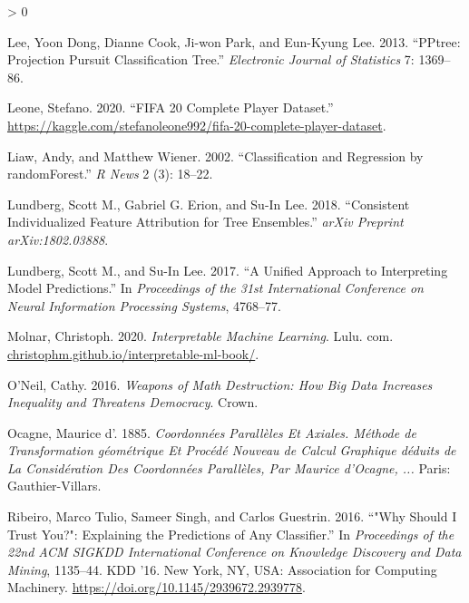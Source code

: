 \documentclass[
]{article}
\newlength{\cslhangindent}
\newenvironment{CSLReferences}[2] %
 {%
  \setlength{\parindent}{0pt}
  \ifodd #1 \everypar{\setlength{\hangindent}{\cslhangindent}}\ignorespaces\fi
  \ifnum #2 > 0
  \setlength{\parskip}{#2\baselineskip}
  \fi
 }%
 {}
\begin{document}
\begin{CSLReferences}{1}{0}
\leavevmode\hypertarget{ref-lee_pptree_2013}{}%
Lee, Yoon Dong, Dianne Cook, Ji-won Park, and Eun-Kyung Lee. 2013. {``{PPtree}: {Projection} Pursuit Classification Tree.''} \emph{Electronic Journal of Statistics} 7: 1369--86.

\leavevmode\hypertarget{ref-leone_fifa_2020}{}%
Leone, Stefano. 2020. {``{FIFA} 20 Complete Player Dataset.''} \url{https://kaggle.com/stefanoleone992/fifa-20-complete-player-dataset}.

\leavevmode\hypertarget{ref-liaw_classification_2002}{}%
Liaw, Andy, and Matthew Wiener. 2002. {``Classification and Regression by {randomForest}.''} \emph{R News} 2 (3): 18--22.

\leavevmode\hypertarget{ref-lundberg_consistent_2018}{}%
Lundberg, Scott M., Gabriel G. Erion, and Su-In Lee. 2018. {``Consistent Individualized Feature Attribution for Tree Ensembles.''} \emph{arXiv Preprint arXiv:1802.03888}.

\leavevmode\hypertarget{ref-lundberg_unified_2017}{}%
Lundberg, Scott M., and Su-In Lee. 2017. {``A Unified Approach to Interpreting Model Predictions.''} In \emph{Proceedings of the 31st International Conference on Neural Information Processing Systems}, 4768--77.

\leavevmode\hypertarget{ref-molnar_interpretable_2020}{}%
Molnar, Christoph. 2020. \emph{Interpretable Machine Learning}. Lulu. com. \href{https://christophm.github.io/interpretable-ml-book/}{christophm.github.io/interpretable-ml-book/}.

\leavevmode\hypertarget{ref-oneil_weapons_2016}{}%
O'Neil, Cathy. 2016. \emph{Weapons of Math Destruction: {How} Big Data Increases Inequality and Threatens Democracy}. Crown.

\leavevmode\hypertarget{ref-ocagne_coordonnees_1885}{}%
Ocagne, Maurice d'. 1885. \emph{Coordonnées Parallèles Et Axiales. {Méthode} de Transformation géométrique Et Procédé Nouveau de Calcul Graphique déduits de La Considération Des Coordonnées Parallèles, Par {Maurice} d'{Ocagne}, ...} Paris: Gauthier-Villars.

\leavevmode\hypertarget{ref-ribeiro_why_2016}{}%
Ribeiro, Marco Tulio, Sameer Singh, and Carlos Guestrin. 2016. {``"{Why} {Should} {I} {Trust} {You}?": {Explaining} the {Predictions} of {Any} {Classifier}.''} In \emph{Proceedings of the 22nd {ACM} {SIGKDD} {International} {Conference} on {Knowledge} {Discovery} and {Data} {Mining}}, 1135--44. {KDD} '16. New York, NY, USA: Association for Computing Machinery. \url{https://doi.org/10.1145/2939672.2939778}.


\end{CSLReferences}
\end{document}
